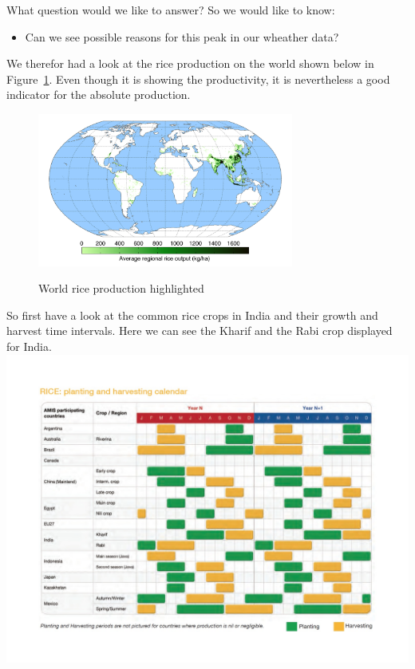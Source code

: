 \documentclass[10pt]{beamer}
\begin{document}
\begin{frame}{What question would we like to answer?}
	So we would like to know: \\
	\begin{itemize}
		\item \large Can we see possible reasons for this peak in our wheather data?
	\end{itemize}
\end{frame}

\begin{frame}
	We therefor had a look at the rice production on the world shown below in Figure~\ref{RiceYield}. Even though it is showing the productivity, it is nevertheless a good indicator for the absolute production.
	\begin{figure}
		\includegraphics[width=0.75\textwidth]{RiceYield.png}
		\label{RiceYield}
		\caption{World rice production highlighted}
	\end{figure}
\end{frame}

\begin{frame}
	So first have a look at the common rice crops in India and their growth and harvest time intervals. Here we can see the Kharif and the Rabi crop displayed for India.
	\includegraphics[width=1\textwidth]{RiceCrops.jpeg}
\end{frame}
\end{document}
